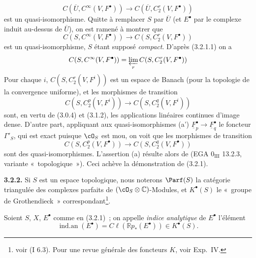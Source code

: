 \[
  C(\overline U,C^\infty(V,F^\bullet))
  \longrightarrow C(\overline U,C_2^r(V,F^\bullet))
\]
est un
quasi-isomorphisme. Quitte à remplacer $S$ par $\overline U$ (et $E^\bullet$ par le complexe induit au-dessus de $\overline U$), on est ramené à montrer que
\[
  C(S,C^\infty(V,F^\bullet))
  \longrightarrow C(S,C_2^r(V,F^\bullet))
\]
est un quasi-isomorphisme, $S$ étant supposé \emph{compact}. D'après (3.2.1.1) on a
\[
  C(S,C^\infty(V,F^\bullet))=
  \varprojlim_r C(S,C_2^r(V,F^\bullet))
\]
Pour chaque $i$, $C(S,C_2^r(V,F^i))$ est un espace de Banach (pour la topologie de la convergence uniforme), et les morphismes de transition
\[
  C(S,C_2^p(V,F^i))\longrightarrow C(S,C_2^q(V,F^i))
\]
sont, en vertu de (3.0.4) et (3.1.2), les applications linéaires continues d'image dense. D'autre part, appliquant aux quasi-isomorphismes (a') $\underline F_p^\bullet\longrightarrow\underline F_q^\bullet$ le foncteur $\Gamma'_S$, qui est exact puisque $\cO_S$ est mou, on voit que les morphismes de transition
\[
  C(S,C_2^p(V,F^\bullet))\longrightarrow C(S,C_2^q(V,F^\bullet))
\]
sont des quasi-isomorphismes. L'assertion (a) résulte alors de (EGA $0_{\mathrm{III}}$ 13.2.3, variante «~topologique~»). Ceci achève la démonstration de (3.2.1).

\textbf{3.2.2.} Si $S$ est un espace topologique, nous noterons $\Parf(S)$ la catégorie triangulée des complexes parfaits de $(\cO_S\otimes\mathbb C)$-Modules, et $K^\bullet(S)$ le «~groupe de Grothendieck~» correspondant\footnote{voir (I 6.3). Pour une revue générale des foncteurs $K$, voir Exp.~IV.}.

Soient $S$, $X$, $E^\bullet$ comme en (3.2.1)~; on appelle \emph{indice analytique} de $E^\bullet$ l'élément
\[
  \operatorname{ind.an}(E^\bullet)=C\ell(\mathbb{R}p_*(E^\bullet))\in K^\bullet(S).
\]
